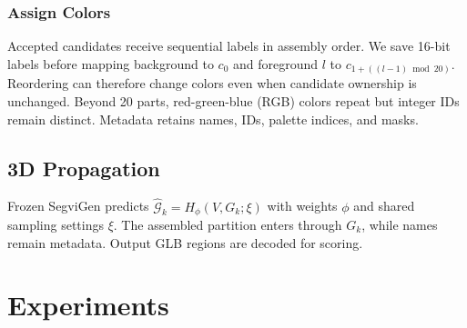\documentclass[pdflatex,sn-mathphys-ay]{sn-jnl}
\begin{document}
\subsubsection{Assign Colors}
Accepted candidates receive sequential labels in assembly order. We save 16-bit labels before mapping background to $c_0$ and foreground $l$ to $c_{1+((l-1)\bmod20)}$. Reordering can therefore change colors even when candidate ownership is unchanged. Beyond 20 parts, red-green-blue (RGB) colors repeat but integer IDs remain distinct. Metadata retains names, IDs, palette indices, and masks.

\subsection{3D Propagation}
Frozen SegviGen predicts $\widehat{\mathcal G}_k=H_\phi(V,G_k;\xi)$ with weights $\phi$ and shared sampling settings $\xi$. The assembled partition enters through $G_k$, while names remain metadata. Output GLB regions are decoded for scoring.

\section{Experiments}\label{sec:experiments}
\end{document}
